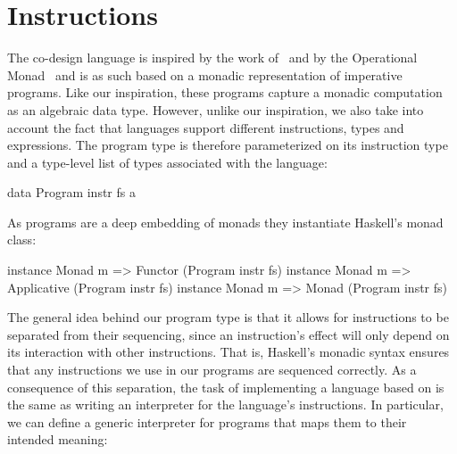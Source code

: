 \documentclass[../main.tex]{subfiles}
\begin{document}



\section{Instructions}
\label{instr}

The co-design language is inspired by the work of~\cite{BjornBenny} and by the Operational Monad~\cite{Operational} and is as such based on a monadic representation of imperative programs. Like our inspiration, these programs capture a monadic computation as an algebraic data type. However, unlike our inspiration, we also take into account the fact that languages support different instructions, types and expressions. The program type is therefore parameterized on its instruction type and a type-level list of types associated with the language:

\begin{code}
data Program instr fs a
\end{code}

\noindent As programs are a deep embedding of monads they instantiate Haskell's monad class:

\begin{code}
instance Monad m => Functor     (Program instr fs)
instance Monad m => Applicative (Program instr fs)
instance Monad m => Monad       (Program instr fs)
\end{code}

The general idea behind our program type is that it allows for instructions to be separated from their sequencing, since an instruction's effect will only depend on its interaction with other instructions. That is, Haskell's monadic syntax ensures that any instructions we use in our programs are sequenced correctly. As a consequence of this separation, the task of implementing a language based on  is the same as writing an interpreter for the language's instructions. In particular, we can define a generic interpreter for programs that maps them to their intended meaning:
\end{document}

